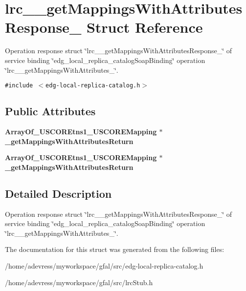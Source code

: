 \section{lrc\_\-\_\-get\-Mappings\-With\-Attributes\-Response\_\- Struct Reference}
\label{structlrc____getMappingsWithAttributesResponse__}
Operation response struct \char`\"{}lrc\_\-\_\-get\-Mappings\-With\-Attributes\-Response\_\-\char`\"{} of service binding \char`\"{}edg\_\-local\_\-replica\_\-catalog\-Soap\-Binding\char`\"{} operation \char`\"{}lrc\_\-\_\-get\-Mappings\-With\-Attributes\_\-\char`\"{}.  


{\tt \#include $<$edg-local-replica-catalog.h$>$}

\subsection*{Public Attributes}
\begin{CompactItemize}
\item 
\bf{Array\-Of\_\-USCOREtns1\_\-USCOREMapping} $\ast$ \textbf{\_\-get\-Mappings\-With\-Attributes\-Return}\label{structlrc____getMappingsWithAttributesResponse___8704a00077e70e5d7d9dd775aad4bb19}

\item 
\bf{Array\-Of\_\-USCOREtns1\_\-USCOREMapping} $\ast$ \textbf{\_\-get\-Mappings\-With\-Attributes\-Return}\label{structlrc____getMappingsWithAttributesResponse___8704a00077e70e5d7d9dd775aad4bb19}

\end{CompactItemize}


\subsection{Detailed Description}
Operation response struct \char`\"{}lrc\_\-\_\-get\-Mappings\-With\-Attributes\-Response\_\-\char`\"{} of service binding \char`\"{}edg\_\-local\_\-replica\_\-catalog\-Soap\-Binding\char`\"{} operation \char`\"{}lrc\_\-\_\-get\-Mappings\-With\-Attributes\_\-\char`\"{}. 



The documentation for this struct was generated from the following files:\begin{CompactItemize}
\item 
/home/adevress/myworkspace/gfal/src/edg-local-replica-catalog.h\item 
/home/adevress/myworkspace/gfal/src/lrc\-Stub.h\end{CompactItemize}
